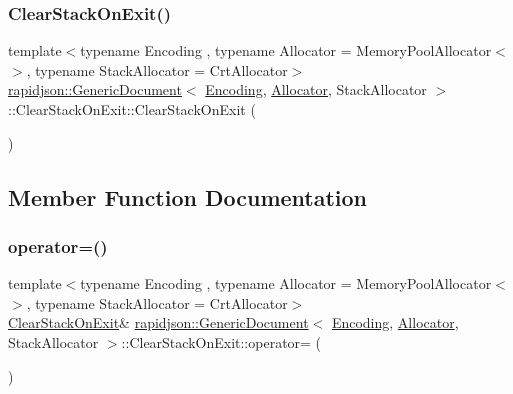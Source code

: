 \subsubsection{\texorpdfstring{ClearStackOnExit()}{ClearStackOnExit()}\hspace{0.1cm}{\footnotesize\ttfamily [2/2]}}
{\footnotesize\ttfamily template$<$typename Encoding , typename Allocator  = Memory\+Pool\+Allocator$<$$>$, typename Stack\+Allocator  = Crt\+Allocator$>$ \\
\mbox{\hyperlink{classrapidjson_1_1_generic_document}{rapidjson\+::\+Generic\+Document}}$<$ \mbox{\hyperlink{classrapidjson_1_1_encoding}{Encoding}}, \mbox{\hyperlink{classrapidjson_1_1_allocator}{Allocator}}, Stack\+Allocator $>$\+::Clear\+Stack\+On\+Exit\+::\+Clear\+Stack\+On\+Exit (\begin{DoxyParamCaption}\item[{const \mbox{\hyperlink{structrapidjson_1_1_generic_document_1_1_clear_stack_on_exit}{Clear\+Stack\+On\+Exit}} \&}]{ }\end{DoxyParamCaption})\hspace{0.3cm}{\ttfamily [private]}}



\subsection{Member Function Documentation}
\mbox{\label{structrapidjson_1_1_generic_document_1_1_clear_stack_on_exit_a438e63896b8d34cafa2e43496b0287d4}} 
\subsubsection{\texorpdfstring{operator=()}{operator=()}}
{\footnotesize\ttfamily template$<$typename Encoding , typename Allocator  = Memory\+Pool\+Allocator$<$$>$, typename Stack\+Allocator  = Crt\+Allocator$>$ \\
\mbox{\hyperlink{structrapidjson_1_1_generic_document_1_1_clear_stack_on_exit}{Clear\+Stack\+On\+Exit}}\& \mbox{\hyperlink{classrapidjson_1_1_generic_document}{rapidjson\+::\+Generic\+Document}}$<$ \mbox{\hyperlink{classrapidjson_1_1_encoding}{Encoding}}, \mbox{\hyperlink{classrapidjson_1_1_allocator}{Allocator}}, Stack\+Allocator $>$\+::Clear\+Stack\+On\+Exit\+::operator= (\begin{DoxyParamCaption}\item[{const \mbox{\hyperlink{structrapidjson_1_1_generic_document_1_1_clear_stack_on_exit}{Clear\+Stack\+On\+Exit}} \&}]{ }\end{DoxyParamCaption})\hspace{0.3cm}{\ttfamily [private]}}



